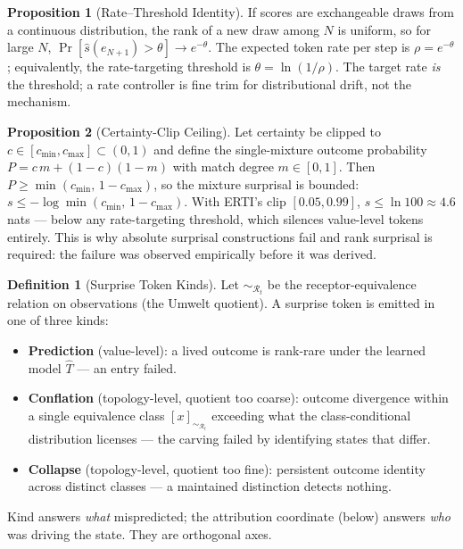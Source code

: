\documentclass[12pt]{article}
\theoremstyle{definition}
\newtheorem{definition}{Definition}
\newtheorem{proposition}{Proposition}
\begin{document}
\begin{proposition}[Rate--Threshold Identity]
If scores are exchangeable draws from a continuous distribution, the rank of a new draw
among $N$ is uniform, so for large $N$,
$\Pr[\hat{s}(e_{N+1}) > \theta] \to e^{-\theta}$. The expected token rate per step is
$\rho = e^{-\theta}$; equivalently, the rate-targeting threshold is
$\theta = \ln(1/\rho)$. The target rate \emph{is} the threshold; a rate controller is
fine trim for distributional drift, not the mechanism.
\end{proposition}

\begin{proposition}[Certainty-Clip Ceiling]
Let certainty be clipped to $c \in [c_{\min}, c_{\max}] \subset (0,1)$ and define the
single-mixture outcome probability $P = c\,m + (1-c)(1-m)$ with match degree
$m \in [0,1]$. Then $P \geq \min(c_{\min},\, 1 - c_{\max})$, so the mixture surprisal is
bounded: $s \leq -\log \min(c_{\min},\, 1 - c_{\max})$. With ERTI's clip $[0.05, 0.99]$,
$s \leq \ln 100 \approx 4.6$ nats --- below any rate-targeting threshold, which silences
value-level tokens entirely. This is why absolute surprisal constructions fail and rank
surprisal is required: the failure was observed empirically before it was derived.
\end{proposition}

\begin{definition}[Surprise Token Kinds]
Let $\sim_{\mathcal{R}_t}$ be the receptor-equivalence relation on observations (the
Umwelt quotient). A surprise token is emitted in one of three kinds:
\begin{itemize}
    \item \textbf{Prediction} (value-level): a lived outcome is rank-rare under the
    learned model $\hat{T}$ --- an entry failed.
    \item \textbf{Conflation} (topology-level, quotient too coarse): outcome divergence
    within a single equivalence class $[x]_{\sim_{\mathcal{R}_t}}$ exceeding what the
    class-conditional distribution licenses --- the carving failed by identifying states
    that differ.
    \item \textbf{Collapse} (topology-level, quotient too fine): persistent outcome
    identity across distinct classes --- a maintained distinction detects nothing.
\end{itemize}
Kind answers \emph{what} mispredicted; the attribution coordinate (below) answers
\emph{who} was driving the state. They are orthogonal axes.
\end{definition}
\end{document}
